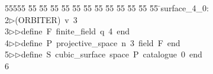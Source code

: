 %
%
\begin{tabbing}
55555 \= 55 \= 55 \= 55 \= 55 \= 55 \= 55 \= 55 \= 55 \= 55 \= 55 \= 55 \= 55 \= \>surface\_4\_0:\\[0pt]
2\>$\triangleright$\>(ORBITER)\ v\ 3\ \\[0pt]
3\>$\triangleright$\>$\triangleright$\>define\ F\ finite\_field\ q\ 4\ end\ \\[0pt]
4\>$\triangleright$\>$\triangleright$\>define\ P\ projective\_space\ n\ 3\ field\ F\ end\ \\[0pt]
5\>$\triangleright$\>$\triangleright$\>define\ S\ cubic\_surface\ space\ P\ catalogue\ 0\ end\ \\[0pt]
6\>\end{tabbing}
